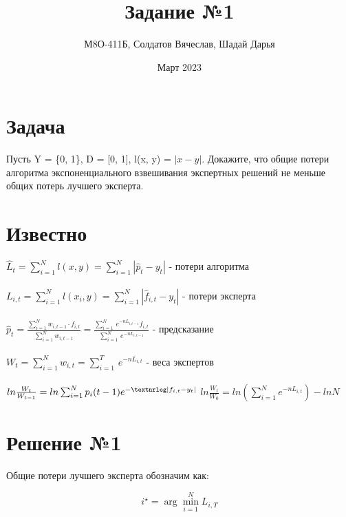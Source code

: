 \documentclass{article}
\title{Задание №1}
\author{М8О-411Б, Солдатов Вячеслав, Шадай Дарья}
\date{Март 2023}
\newcommand{\mathnrleg}{\textnormal{\textnrleg}}
\begin{document}
\maketitle

\section{Задача}
Пусть Y = \{0, 1\}, D = [0, 1], l(x, y) = $|x - y|$. Докажите, что общие потери алгоритма экспоненциального взвешивания экспертных решений не меньше общих потерь
лучшего эксперта.

\section{Известно}
{\Large
\noindent $\hat{L}_t = \sum_{i=1}^N l(x,y) = \sum_{i=1}^N |\hat{p}_t - y_t|$ - потери алгоритма \\\\
$L_{i,t} = \sum_{i=1}^N l(x_i,y) = \sum_{i=1}^N |\hat{f}_{i,t} - y_t|$ - потери эксперта \\\\
$\hat{p}_t = \frac{\sum_{i=1}^N w_{i,t-1} \cdot f_{i,t}}{\sum_{i=1}^N w_{i,t-1}} = \frac{\sum_{i=1}^{N}\, e^{-nL_{i,t-1}}f_{i,t}}{\sum_{i=1}^{N}\, e^{-nL_{i,t-1}}}$ - предсказание \\\\
$W_t = \sum_{i=1}^N w_{i,t} = \sum_{i=1}^{T}\, e^{-nL_{i,t}}$ - веса экспертов \\\\
$ln\frac{W_t}{W_{t-1}} = ln\sum_{i=1}^N p_i(t-1)e^{-\mathnrleg|f_{i,t}-y_t|} \\\\$
$ln\frac{W_t}{W_{0}} = ln(\sum_{i=1}^N e^{-nL_{i,t}})-lnN$
}

\section{Решение №1}

Общие потери лучшего эксперта обозначим как:

$$i^\star = \arg\min_{i=1}^N L_{i,T}$$
\end{document}
